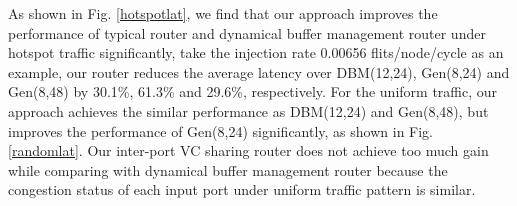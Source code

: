 \documentclass[10pt,conference]{IEEEtran}
\begin{document}
As shown in Fig. \ref{hotspotlat}, we find that our approach improves the performance of typical router and dynamical buffer management router under hotspot traffic significantly, take the injection rate 0.00656 flits/node/cycle as an example, our router reduces the average latency over DBM(12,24), Gen(8,24) and Gen(8,48) by 30.1\%, 61.3\% and 29.6\%, respectively. For the uniform traffic, our approach achieves the similar performance as DBM(12,24) and Gen(8,48), but improves the performance of Gen(8,24) significantly, as shown in Fig. \ref{randomlat}. Our inter-port VC sharing router does not achieve too much gain while comparing with dynamical buffer management router because the congestion status of each input port under uniform traffic pattern is similar.

\end{document}
